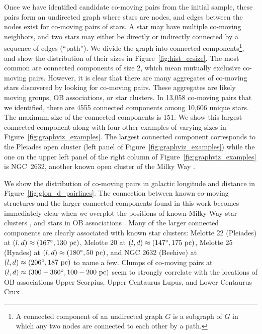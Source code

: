 \documentclass[manuscript, letterpaper]{aastex6}
\begin{document}
Once we have identified candidate co-moving pairs from the initial
sample, these pairs form an undirected graph where stars are nodes, and edges
between the nodes exist for co-moving pairs of stars.
A star may have multiple co-moving neighbors, and two stars may either
be directly or indirectly connected by a sequence of edges (``path'').
We divide the graph into connected components\footnote{A connected component of an undirected graph $G$
is a subgraph of $G$ in which any two nodes are connected to each other by a path.},
and show the distribution of their sizes in Figure~\ref{fig:hist_ccsize}.
The most common are connected components of size 2, which mean mutually exclusive co-moving
pairs. However, it is clear that there are many aggregates of co-moving stars
discovered by looking for co-moving pairs.
These aggregates are likely moving groups, OB associations, or star clusters.
In 13,058 co-moving pairs that we identified,
there are 4555 connected components among 10,606 unique stars.
The maximum size of the connected components is 151.
We show this largest connected component along with four other
examples of varying sizes in Figure~\ref{fig:graphviz_examples}.
The largest connected component corresponds to the Pleiades open cluster (left panel of Figure~\ref{fig:graphviz_examples})
while the one on the upper left panel of the right column of Figure~\ref{fig:graphviz_examples}
is NGC~2632, another known open cluster of the Milky Way \citep{Kharchenko:2016aa}.

We show the distribution of co-moving pairs in galactic longitude and
distance in Figure~\ref{fig:glon_d_pairlines}.
The connection between known co-moving structures and
the larger connected components found in this work becomes immediately clear when
we overplot the positions of known Milky Way star clusters \citep{Kharchenko:2016aa},
and stars in OB associations \citep{de-Zeeuw:1999aa}.
Many of the larger connected components are
clearly associated with known star clusters:
Melotte 22 (Pleiades) at $(l,d)\approx (167\mbox{$^\circ$}, 130~\textrm{pc})$,
Melotte 20 at $(l,d)\approx (147\mbox{$^\circ$}, 175~\textrm{pc})$,
Melotte 25 (Hyades) at $(l,d)\approx (180\mbox{$^\circ$}, 50~\textrm{pc})$, and
NGC 2632 (Beehive) at $(l,d)\approx (206\mbox{$^\circ$}, 187~\textrm{pc})$
to name a few.
Clumps of co-moving pairs at $(l,d)\approx (300-360\mbox{$^\circ$}, 100-200~\textrm{pc})$
seem to strongly correlate with the locations of OB associations
Upper Scorpius, Upper Centaurus Lupus, and Lower Centaurus Crux
\citep{de-Zeeuw:1999aa}.
\end{document}
